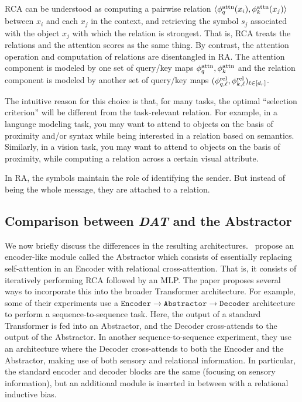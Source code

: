 RCA can be understood as computing a pairwise relation $\langle \phi_q^{\mathrm{attn}}(x_i), \phi_k^{\mathrm{attn}}(x_j) \rangle$ between $x_i$ and each $x_j$ in the context, and retrieving the symbol $s_j$ associated with the object $x_j$ with which the relation is strongest. That is, RCA treats the relations and the attention scores as the same thing. By contrast, the attention operation and computation of relations are disentangled in RA. The attention component is modeled by one set of query/key maps $\phi_q^{\mathrm{attn}}, \phi_k^{\mathrm{attn}}$ and the relation component is modeled by another set of query/key maps $(\phi_{q, \ell}^{\mathrm{rel}}, \phi_{k, \ell}^{\mathrm{rel}})_{\ell \in [d_r]}$.

The intuitive reason for this choice is that, for many tasks, the optimal ``selection criterion'' will be different from the task-relevant relation. For example, in a language modeling task, you may want to attend to objects on the basis of proximity and/or syntax while being interested in a relation based on semantics. Similarly, in a vision task, you may want to attend to objects on the basis of proximity, while computing a relation across a certain visual attribute.

In RA, the symbols maintain the role of identifying the sender. But instead of being the whole message, they are attached to a relation.

\subsection{Comparison between \textit{DAT} and the Abstractor}

We now briefly discuss the differences in the resulting architectures.~\citet{altabaa2024abstractors} propose an encoder-like module called the Abstractor which consists of essentially replacing self-attention in an Encoder with relational cross-attention. That is, it consists of iteratively performing RCA followed by an MLP. The paper proposes several ways to incorporate this into the broader Transformer architecture. For example, some of their experiments use a $\texttt{Encoder} \to \texttt{Abstractor} \to \texttt{Decoder}$ architecture to perform a sequence-to-sequence task. Here, the output of a standard Transformer is fed into an Abstractor, and the Decoder cross-attends to the output of the Abstractor. In another sequence-to-sequence experiment, they use an architecture where the Decoder cross-attends to both the Encoder and the Abstractor, making use of both sensory and relational information. In particular, the standard encoder and decoder blocks are the same (focusing on sensory information), but an additional module is inserted in between with a relational inductive bias.

